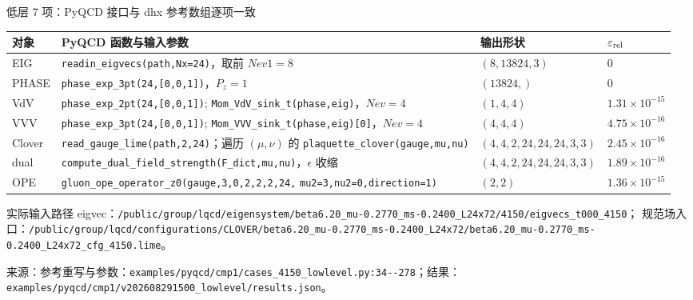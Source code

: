 \documentclass[UTF8,aspectratio=169,11pt]{ctexbeamer}
\newcommand{\source}[1]{\vspace{0.05em}\par{\raggedright\scriptsize\color{muted}来源：#1\par}}
\newcommand{\codepath}[1]{\nolinkurl{#1}}
\begin{document}
\begin{frame}[t]{低层 7 项：PyQCD 接口与 dhx 参考数组逐项一致}
  \scriptsize
  \setlength{\tabcolsep}{3pt}
  \renewcommand{\arraystretch}{1.05}
  \begin{tabularx}{0.96\textwidth}{@{}l Y l l@{}}
    \toprule
    对象 & PyQCD 函数与输入参数 & 输出形状 & $\varepsilon_{\rm rel}$ \\
    \midrule
    EIG & \codepath{readin_eigvecs(path,Nx=24)}，取前 $Nev1=8$ & $(8,13824,3)$ & $0$ \\
    PHASE & \codepath{phase_exp_3pt(24,[0,0,1])}，$P_z=1$ & $(13824,)$ & $0$ \\
    VdV & \codepath{phase_exp_2pt(24,[0,0,1])};\newline
      \codepath{Mom_VdV_sink_t(phase,eig)}，$Nev=4$ & $(1,4,4)$ & $1.31\times10^{-15}$ \\
    VVV & \codepath{phase_exp_3pt(24,[0,0,1])};\newline
      \codepath{Mom_VVV_sink_t(phase,eig)[0]}，$Nev=4$ & $(4,4,4)$ & $4.75\times10^{-16}$ \\
    Clover & \codepath{read_gauge_lime(path,2,24)}；遍历 $(\mu,\nu)$ 的\newline
      \codepath{plaquette_clover(gauge,mu,nu)} & $(4,4,2,24,24,24,3,3)$ & $2.45\times10^{-16}$ \\
    dual & \codepath{compute_dual_field_strength(F_dict,mu,nu)}，$\epsilon$ 收缩 & $(4,4,2,24,24,24,3,3)$ & $1.89\times10^{-16}$ \\
    OPE & \codepath{gluon_ope_operator_z0(gauge,3,0,2,2,2,24,}\newline
      \codepath{mu2=3,nu2=0,direction=1)} & $(2,2)$ & $1.36\times10^{-15}$ \\
    \bottomrule
  \end{tabularx}
  \vspace{0.12em}
  \begin{block}{实际输入路径}
    eigvec：\codepath{/public/group/lqcd/eigensystem/beta6.20_mu-0.2770_ms-0.2400_L24x72/4150/eigvecs_t000_4150}；\newline
    规范场入口：\codepath{/public/group/lqcd/configurations/CLOVER/beta6.20_mu-0.2770_ms-0.2400_L24x72/beta6.20_mu-0.2770_ms-0.2400_L24x72_cfg_4150.lime}。
  \end{block}
  \source{参考重写与参数：\codepath{examples/pyqcd/cmp1/cases_4150_lowlevel.py:34--278}；结果：\codepath{examples/pyqcd/cmp1/v202608291500_lowlevel/results.json}。}
\end{frame}
\end{document}

